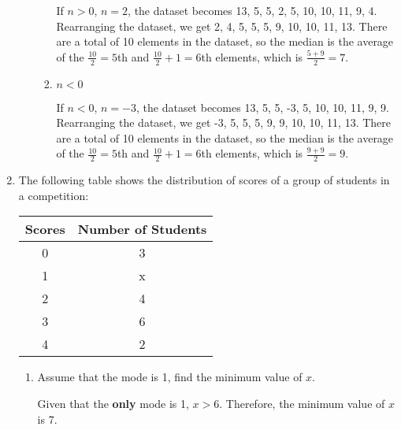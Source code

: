 \documentclass{report}
\begin{document}
\begin{multicols}{2}
\begin{enumerate}
\begin{enumerate}
\begin{enumerate}
                          If $n > 0$, $n = 2$, the dataset becomes 13, 5, 5, 2, 5, 10, 10, 11, 9, 4.
                          Rearranging the dataset, we get 2, 4, 5, 5, 5, 9, 10, 10, 11, 13. There are a
                          total of 10 elements in the dataset, so the median is the average of the
                          $\frac{10}{2} = 5$th and $\frac{10}{2} + 1 = 6$th elements, which is
                          $\frac{5+9}{2} = 7$.

                    \item $n < 0$
                          \sol{}

                          If $n < 0$, $n = -3$, the dataset becomes 13, 5, 5, -3, 5, 10, 10, 11, 9, 9.
                          Rearranging the dataset, we get -3, 5, 5, 5, 9, 9, 10, 10, 11, 13. There are a
                          total of 10 elements in the dataset, so the median is the average of the
                          $\frac{10}{2} = 5$th and $\frac{10}{2} + 1 = 6$th elements, which is
                          $\frac{9+9}{2} = 9$.
                  \end{enumerate}
          \end{enumerate}

    \item The following table shows the distribution of scores of a group of students in
          a competition:
          \begin{center}
            \begin{tabular}{|c|c|}
              \hline
              Scores & Number of Students \\ \hline
              0      & 3                  \\
              1      & x                  \\
              2      & 4                  \\
              3      & 6                  \\
              4      & 2                  \\
              \hline
            \end{tabular}
          \end{center}
          \begin{enumerate}
            \item Assume that the mode is 1, find the minimum value of $x$. \sol{}

                  Given that the \textbf{only} mode is 1, $x > 6$. Therefore, the minimum value
                  of $x$ is 7.


\end{enumerate}
\end{enumerate}
\end{multicols}
\end{document}
